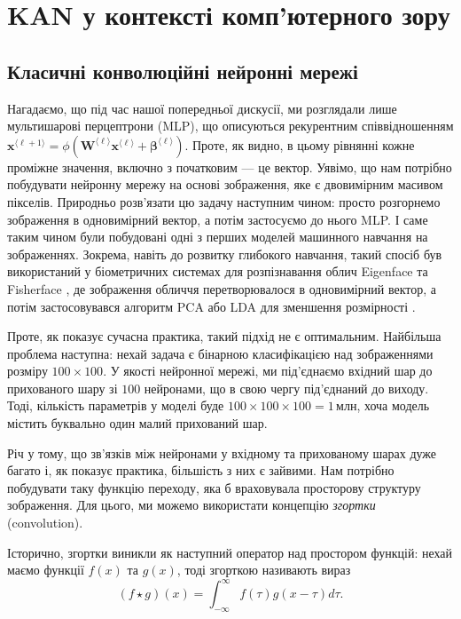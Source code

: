 \chapter{KAN у контексті комп'ютерного зору}

\section{Класичні конволюційні нейронні мережі}

Нагадаємо, що під час нашої попередньої дискусії, ми розглядали лише
мультишарові перцептрони (MLP), що описуються рекурентним співвідношенням
$\mathbf{x}^{\langle \ell+1 \rangle} = \phi(\boldsymbol{W}^{\langle \ell
\rangle}\mathbf{x}^{\langle \ell \rangle} + \boldsymbol{\beta}^{\langle \ell
\rangle})$. Проте, як видно, в цьому рівнянні кожне проміжне значення, включно з
початковим --- це вектор. Уявімо, що нам потрібно побудувати нейронну мережу на
основі зображення, яке є двовимірним масивом пікселів. Природньо розв'язати цю
задачу наступним чином: просто розгорнемо зображення в одновимірний вектор, а
потім застосуємо до нього MLP. І саме таким чином були побудовані одні з перших
моделей машинного навчання на зображеннях. Зокрема, навіть до розвитку глибокого
навчання, такий спосіб був використаний у біометричних системах для
розпізнавання облич Eigenface \cite{eigenface} та Fisherface \cite{fisherface},
де зображення обличчя перетворювалося в одновимірний вектор, а потім
застосовувався алгоритм PCA або LDA для зменшення розмірності \cite{pca}.

Проте, як показує сучасна практика, такий підхід не є оптимальним. Найбільша 
проблема наступна: нехай задача є бінарною класифікацією над зображеннями 
розміру $100 \times 100$. У якості нейронної мережі, ми під'єднаємо 
вхідний шар до прихованого шару зі $100$ нейронами, що в свою чергу 
під'єднаний до виходу. Тоді, кількість параметрів у моделі буде 
$100 \times 100 \times 100 = 1 \, \text{млн}$, хоча модель містить 
буквально один малий прихований шар. 

Річ у тому, що зв'язків між нейронами у вхідному та прихованому шарах
дуже багато і, як показує практика, більшість з них є зайвими. Нам 
потрібно побудувати таку функцію переходу, яка б враховувала 
просторову структуру зображення. Для цього, ми можемо
використати концепцію \textit{згортки} (convolution).

Історично, згортки виникли як наступний оператор над простором 
функцій: нехай маємо функції $f(x)$ та $g(x)$, тоді згорткою 
називають вираз
\begin{equation}
    (f \star g)(x) = \int_{-\infty}^{\infty} f(\tau) g(x - \tau) d\tau.
\end{equation}

